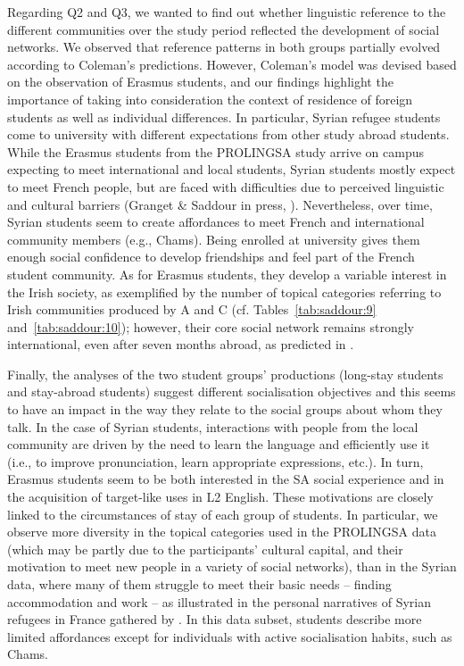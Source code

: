 \documentclass[output=paper]{langscibook}
\begin{document}
Regarding Q2 and Q3, we wanted to find out whether linguistic reference to the different communities over the study period reflected the development of social networks. We observed that reference patterns in both groups partially evolved according to Coleman’s predictions. However, Coleman’s model was devised based on the observation of Erasmus students, and our findings highlight the importance of taking into consideration the context of residence of foreign students as well as individual differences. In particular, Syrian refugee students come to university with different expectations from other study abroad students. While the Erasmus students from the PROLINGSA study arrive on campus expecting to meet international and local students, Syrian students mostly expect to meet French people, but are faced with difficulties due to perceived linguistic and cultural barriers (Granget \& Saddour in press, \citealt{Alsadhan2022}). Nevertheless, over time, Syrian students seem to create affordances to meet French and international community members (e.g., Chams). Being enrolled at university gives them enough social confidence to develop friendships and feel part of the French student community. As for Erasmus students, they develop a variable interest in the Irish society, as exemplified by the number of topical categories referring to Irish communities produced by A and C (cf. Tables~\ref{tab:saddour:9} and~\ref{tab:saddour:10}); however, their core social network remains strongly international, even after seven months abroad, as predicted in \citet{Coleman2013, Coleman2015}.

Finally, the analyses of the two student groups’ productions (long-stay students and stay-abroad students) suggest different socialisation objectives and this seems to have an impact in the way they relate to the social groups about whom they talk. In the case of Syrian students, interactions with people from the local community are driven by the need to learn the language and efficiently use it (i.e., to improve pronunciation, learn appropriate expressions, etc.). In turn, Erasmus students seem to be both interested in the SA social experience and in the acquisition of target-like uses in L2 English. These motivations are closely linked to the circumstances of stay of each group of students. In particular, we observe more diversity in the topical categories used in the PROLINGSA data (which may be partly due to the participants’ cultural capital, and their motivation to meet new people in a variety of social networks), than in the Syrian data, where many of them struggle to meet their basic needs – finding accommodation and work – as illustrated in the personal narratives of Syrian refugees in France gathered by \citet{Alsadhan2022}. In this data subset, students describe more limited affordances except for individuals with active socialisation habits, such as Chams.
\end{document}
